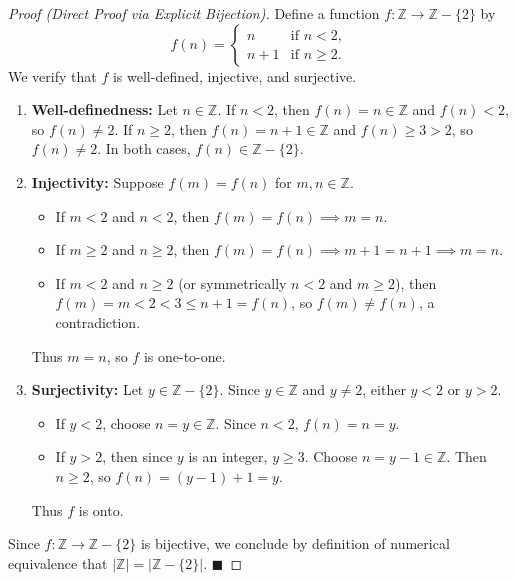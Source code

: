 \documentclass[11pt, letterpaper]{article}
\theoremstyle{definition}
\theoremstyle{remark}
\begin{document}
\begin{proof}[Proof (Direct Proof via Explicit Bijection)]
Define a function $f : \mathbb{Z} \to \mathbb{Z} - \{2\}$ by
\[
f(n) =
\begin{cases}
n & \text{if } n < 2, \\
n + 1 & \text{if } n \geq 2.
\end{cases}
\]
We verify that $f$ is well-defined, injective, and surjective.
\begin{enumerate}[label=(\arabic*)]
    \item \textbf{Well-definedness:} Let $n \in \mathbb{Z}$. If $n < 2$, then $f(n) = n \in \mathbb{Z}$ and $f(n) < 2$, so $f(n) \neq 2$. If $n \geq 2$, then $f(n) = n + 1 \in \mathbb{Z}$ and $f(n) \geq 3 > 2$, so $f(n) \neq 2$. In both cases, $f(n) \in \mathbb{Z} - \{2\}$.
    
    \item \textbf{Injectivity:} Suppose $f(m) = f(n)$ for $m, n \in \mathbb{Z}$.
    \begin{itemize}
        \item If $m < 2$ and $n < 2$, then $f(m) = f(n) \implies m = n$.
        \item If $m \geq 2$ and $n \geq 2$, then $f(m) = f(n) \implies m + 1 = n + 1 \implies m = n$.
        \item If $m < 2$ and $n \geq 2$ (or symmetrically $n < 2$ and $m \geq 2$), then $f(m) = m < 2 < 3 \leq n + 1 = f(n)$, so $f(m) \neq f(n)$, a contradiction.
    \end{itemize}
    Thus $m = n$, so $f$ is one-to-one.
    
    \item \textbf{Surjectivity:} Let $y \in \mathbb{Z} - \{2\}$. Since $y \in \mathbb{Z}$ and $y \neq 2$, either $y < 2$ or $y > 2$.
    \begin{itemize}
        \item If $y < 2$, choose $n = y \in \mathbb{Z}$. Since $n < 2$, $f(n) = n = y$.
        \item If $y > 2$, then since $y$ is an integer, $y \geq 3$. Choose $n = y - 1 \in \mathbb{Z}$. Then $n \geq 2$, so $f(n) = (y - 1) + 1 = y$.
    \end{itemize}
    Thus $f$ is onto.
\end{enumerate}
Since $f : \mathbb{Z} \to \mathbb{Z} - \{2\}$ is bijective, we conclude by definition of numerical equivalence that $|\mathbb{Z}| = |\mathbb{Z} - \{2\}|$. $\blacksquare$
\end{proof}
\end{document}
